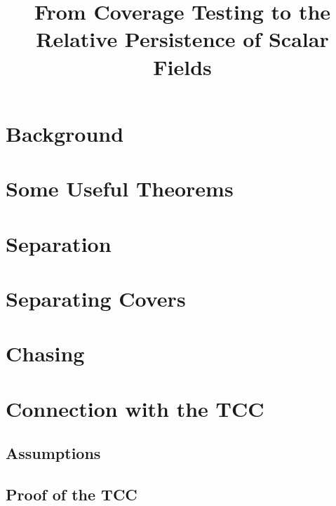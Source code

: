 \documentclass[12pt]{article}
\title{From Coverage Testing to the Relative Persistence of Scalar Fields}
\begin{document}
  \maketitle

  
  
  \clearpage

  \section{Background}
  
  
  
  

  \section{Some Useful Theorems}
  

  \section{Separation}
  

  \section{Separating Covers}
  

  \section{Chasing}
  


  \section{Connection with the TCC}

  \subsection{Assumptions}\label{ssec:assumptions}
  

  \subsection{Proof of the TCC}
  
\end{document}
